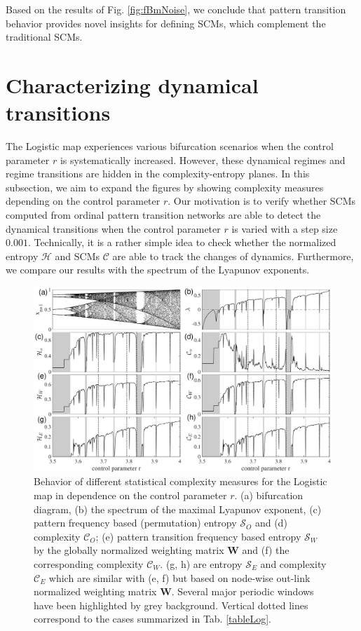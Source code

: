 \documentclass[12pt,aip,cha,reprint,nofootinbib]{revtex4-1}
\begin{document}
Based on the results of Fig. \ref{fig:fBmNoise}, we conclude that pattern transition behavior provides novel insights for defining SCMs, which complement the traditional SCMs. 

\section{Characterizing dynamical transitions} \label{sec:transi}
The Logistic map experiences various bifurcation scenarios when the control parameter $r$ is systematically increased. However, these dynamical regimes and regime transitions are hidden in the complexity-entropy planes. In this subsection, we aim to expand the figures by showing complexity measures depending on the control parameter $r$. Our motivation is to verify whether SCMs computed from ordinal pattern transition networks are able to detect the dynamical transitions when the control parameter $r$ is varied with a step size $0.001$. Technically, it is a rather simple idea to check whether the normalized entropy $\mathcal{H}$ and SCMs $\mathcal{C}$ are able to track the changes of dynamics. Furthermore, we compare our results with the spectrum of the Lyapunov exponents. 

\begin{figure}
	\centering 
	\includegraphics[width=2\columnwidth]{logisticEntropy.pdf}
\caption{\small{Behavior of different statistical complexity measures for the Logistic map in dependence on the control parameter $r$. (a) bifurcation diagram, (b) the spectrum of the maximal Lyapunov exponent, (c) pattern frequency based (permutation) entropy $\mathcal{S}_O$ and (d) complexity $\mathcal{C}_O$; (e) pattern transition frequency based entropy $\mathcal{S}_W$ by the globally normalized weighting matrix $\mathbf{W}$ and (f) the corresponding complexity $\mathcal{C}_W$. (g, h) are entropy $\mathcal{S}_E$ and complexity $\mathcal{C}_E$ which are similar with (e, f) but based on node-wise out-link normalized weighting matrix $\mathbf{W}$. Several major periodic windows have been highlighted by grey background. Vertical dotted lines correspond to the cases summarized in Tab. \ref{tableLog}. } \label{fig:bifurcation}}
\end{figure}
\end{document}
